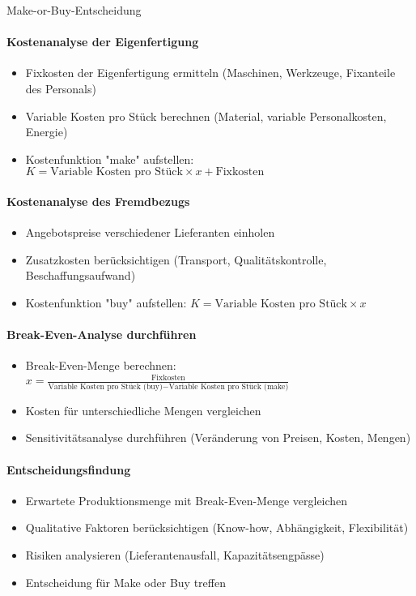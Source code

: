 \begin{KR}{Make-or-Buy-Entscheidung}\\
\paragraph{Kostenanalyse der Eigenfertigung}
\begin{itemize}
    \item Fixkosten der Eigenfertigung ermitteln (Maschinen, Werkzeuge, Fixanteile des Personals)
    \item Variable Kosten pro Stück berechnen (Material, variable Personalkosten, Energie)
    \item Kostenfunktion "make" aufstellen: $K = \text{Variable Kosten pro Stück} \times x + \text{Fixkosten}$
\end{itemize}

\paragraph{Kostenanalyse des Fremdbezugs}
\begin{itemize}
    \item Angebotspreise verschiedener Lieferanten einholen
    \item Zusatzkosten berücksichtigen (Transport, Qualitätskontrolle, Beschaffungsaufwand)
    \item Kostenfunktion "buy" aufstellen: $K = \text{Variable Kosten pro Stück} \times x$
\end{itemize}

\paragraph{Break-Even-Analyse durchführen}
\begin{itemize}
    \item Break-Even-Menge berechnen: $x = \frac{\text{Fixkosten}}{\text{Variable Kosten pro Stück (buy)} - \text{Variable Kosten pro Stück (make)}}$
    \item Kosten für unterschiedliche Mengen vergleichen
    \item Sensitivitätsanalyse durchführen (Veränderung von Preisen, Kosten, Mengen)
\end{itemize}

\paragraph{Entscheidungsfindung}
\begin{itemize}
    \item Erwartete Produktionsmenge mit Break-Even-Menge vergleichen
    \item Qualitative Faktoren berücksichtigen (Know-how, Abhängigkeit, Flexibilität)
    \item Risiken analysieren (Lieferantenausfall, Kapazitätsengpässe)
    \item Entscheidung für Make oder Buy treffen
\end{itemize}
\end{KR}

